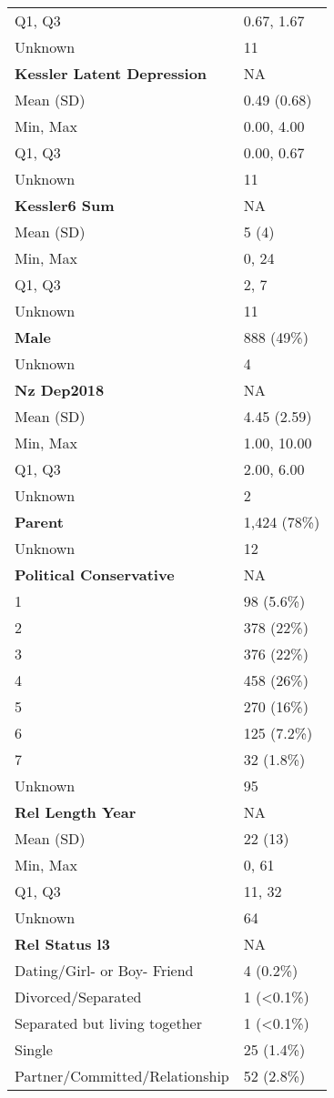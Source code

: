 \documentclass[
  single column]{article}
\begin{document}
\begin{longtable}[]{@{}ll@{}}
Q1, Q3 & 0.67, 1.67 \\
Unknown & 11 \\
\textbf{Kessler Latent Depression} & NA \\
Mean (SD) & 0.49 (0.68) \\
Min, Max & 0.00, 4.00 \\
Q1, Q3 & 0.00, 0.67 \\
Unknown & 11 \\
\textbf{Kessler6 Sum} & NA \\
Mean (SD) & 5 (4) \\
Min, Max & 0, 24 \\
Q1, Q3 & 2, 7 \\
Unknown & 11 \\
\textbf{Male} & 888 (49\%) \\
Unknown & 4 \\
\textbf{Nz Dep2018} & NA \\
Mean (SD) & 4.45 (2.59) \\
Min, Max & 1.00, 10.00 \\
Q1, Q3 & 2.00, 6.00 \\
Unknown & 2 \\
\textbf{Parent} & 1,424 (78\%) \\
Unknown & 12 \\
\textbf{Political Conservative} & NA \\
1 & 98 (5.6\%) \\
2 & 378 (22\%) \\
3 & 376 (22\%) \\
4 & 458 (26\%) \\
5 & 270 (16\%) \\
6 & 125 (7.2\%) \\
7 & 32 (1.8\%) \\
Unknown & 95 \\
\textbf{Rel Length Year} & NA \\
Mean (SD) & 22 (13) \\
Min, Max & 0, 61 \\
Q1, Q3 & 11, 32 \\
Unknown & 64 \\
\textbf{Rel Status l3} & NA \\
Dating/Girl- or Boy- Friend & 4 (0.2\%) \\
Divorced/Separated & 1 (\textless0.1\%) \\
Separated but living together & 1 (\textless0.1\%) \\
Single & 25 (1.4\%) \\
Partner/Committed/Relationship & 52 (2.8\%) \\

\end{longtable}
\end{document}
